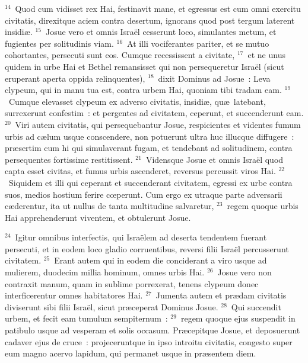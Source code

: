 ${}^{14}$~Quod cum vidisset rex Hai, festinavit mane, et egressus est cum omni exercitu civitatis, direxitque aciem contra desertum, ignorans quod post tergum laterent insidi\ae .
${}^{15}$~Josue vero et omnis Isra\"el cesserunt loco, simulantes metum, et fugientes per solitudinis viam.
${}^{16}$~At illi vociferantes pariter, et se mutuo cohortantes, persecuti sunt eos. Cumque recessissent a civitate,
${}^{17}$~et ne unus quidem in urbe Hai et Bethel remansisset qui non persequeretur Isra\"el (sicut eruperant aperta oppida relinquentes),
${}^{18}$~dixit Dominus ad Josue~: Leva clypeum, qui in manu tua est, contra urbem Hai, quoniam tibi tradam eam.
${}^{19}$~Cumque elevasset clypeum ex adverso civitatis, insidi\ae , qu\ae\ latebant, surrexerunt confestim~: et pergentes ad civitatem, ceperunt, et succenderunt eam.
${}^{20}$~Viri autem civitatis, qui persequebantur Josue, respicientes et videntes fumum urbis ad c\ae lum usque conscendere, non potuerunt ultra huc illucque diffugere~: pr\ae sertim cum hi qui simulaverant fugam, et tendebant ad solitudinem, contra persequentes fortissime restitissent.
${}^{21}$~Vidensque Josue et omnis Isra\"el quod capta esset civitas, et fumus urbis ascenderet, reversus percussit viros Hai.
${}^{22}$~Siquidem et illi qui ceperant et succenderant civitatem, egressi ex urbe contra suos, medios hostium ferire cœperunt. Cum ergo ex utraque parte adversarii c\ae derentur, ita ut nullus de tanta multitudine salvaretur,
${}^{23}$~regem quoque urbis Hai apprehenderunt viventem, et obtulerunt Josue.


${}^{24}$~Igitur omnibus interfectis, qui Isra\"elem ad deserta tendentem fuerant persecuti, et in eodem loco gladio corruentibus, reversi filii Isra\"el percusserunt civitatem.
${}^{25}$~Erant autem qui in eodem die conciderant a viro usque ad mulierem, duodecim millia hominum, omnes urbis Hai.
${}^{26}$~Josue vero non contraxit manum, quam in sublime porrexerat, tenens clypeum donec interficerentur omnes habitatores Hai.
${}^{27}$~Jumenta autem et pr\ae dam civitatis diviserunt sibi filii Isra\"el, sicut pr\ae ceperat Dominus Josue.
${}^{28}$~Qui succendit urbem, et fecit eam tumulum sempiternum~:
${}^{29}$~regem quoque ejus suspendit in patibulo usque ad vesperam et solis occasum. Pr\ae cepitque Josue, et deposuerunt cadaver ejus de cruce~: projeceruntque in ipso introitu civitatis, congesto super eum magno acervo lapidum, qui permanet usque in pr\ae sentem diem.


